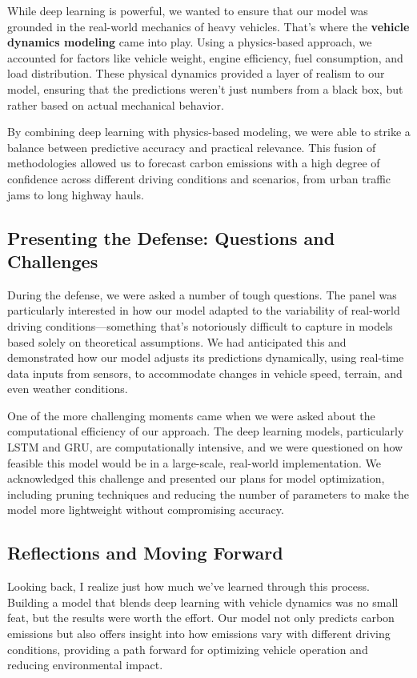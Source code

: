 \documentclass[a4paper]{article} 	%
\begin{document}
While deep learning is powerful, we wanted to ensure that our model was grounded in the real-world mechanics of heavy vehicles. That’s where the \textbf{vehicle dynamics modeling} came into play. Using a physics-based approach, we accounted for factors like vehicle weight, engine efficiency, fuel consumption, and load distribution. These physical dynamics provided a layer of realism to our model, ensuring that the predictions weren’t just numbers from a black box, but rather based on actual mechanical behavior.

By combining deep learning with physics-based modeling, we were able to strike a balance between predictive accuracy and practical relevance. This fusion of methodologies allowed us to forecast carbon emissions with a high degree of confidence across different driving conditions and scenarios, from urban traffic jams to long highway hauls.

\subsection*{Presenting the Defense: Questions and Challenges}

During the defense, we were asked a number of tough questions. The panel was particularly interested in how our model adapted to the variability of real-world driving conditions—something that’s notoriously difficult to capture in models based solely on theoretical assumptions. We had anticipated this and demonstrated how our model adjusts its predictions dynamically, using real-time data inputs from sensors, to accommodate changes in vehicle speed, terrain, and even weather conditions.

One of the more challenging moments came when we were asked about the computational efficiency of our approach. The deep learning models, particularly LSTM and GRU, are computationally intensive, and we were questioned on how feasible this model would be in a large-scale, real-world implementation. We acknowledged this challenge and presented our plans for model optimization, including pruning techniques and reducing the number of parameters to make the model more lightweight without compromising accuracy.

\subsection*{Reflections and Moving Forward}

Looking back, I realize just how much we’ve learned through this process. Building a model that blends deep learning with vehicle dynamics was no small feat, but the results were worth the effort. Our model not only predicts carbon emissions but also offers insight into how emissions vary with different driving conditions, providing a path forward for optimizing vehicle operation and reducing environmental impact.
\end{document}

